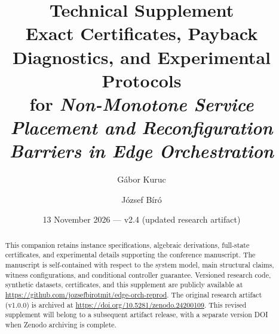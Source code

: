 \documentclass[10pt,a4paper]{article}
\title{Technical Supplement\\[2mm]\large Exact Certificates, Payback Diagnostics, and Experimental Protocols\\ for \emph{Non-Monotone Service Placement and Reconfiguration Barriers in Edge Orchestration}}
\author{G\'abor Kuruc \and J\'ozsef B\'ir\'o}
\date{13 November 2026 --- v2.4 (updated research artifact)}
\begin{document}
\maketitle
\begin{abstract}
This companion retains instance specifications, algebraic derivations, full-state certificates, and experimental details supporting the conference manuscript. The manuscript is self-contained with respect to the system model, main structural claims, witness configurations, and conditional controller guarantee. Versioned research code, synthetic datasets, certificates, and this supplement are publicly available at \url{https://github.com/jozsefbirotmit/edge-orch-reprod}. The original research artifact (v1.0.0) is archived at \url{https://doi.org/10.5281/zenodo.24200109}. This revised supplement will belong to a subsequent artifact release, with a separate version DOI when Zenodo archiving is complete.
\end{abstract}
\tableofcontents
\end{document}
